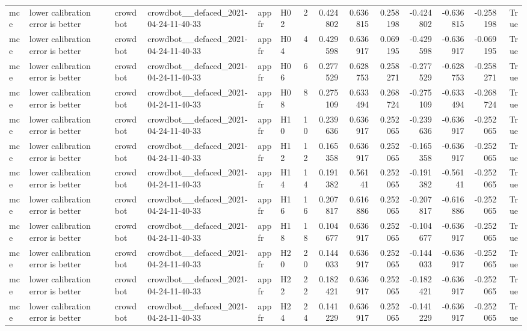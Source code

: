 \begin{longtable}{llllllrrrrrrrr}
mce & lower calibration error is better & crowdbot & crowdbot\_\_defaced\_2021-04-24-11-40-33 & appfr & H02 & 2 & 0.424802 & 0.636815 & 0.258198 & -0.424802 & -0.636815 & -0.258198 & True \\
mce & lower calibration error is better & crowdbot & crowdbot\_\_defaced\_2021-04-24-11-40-33 & appfr & H04 & 4 & 0.429598 & 0.636917 & 0.069195 & -0.429598 & -0.636917 & -0.069195 & True \\
mce & lower calibration error is better & crowdbot & crowdbot\_\_defaced\_2021-04-24-11-40-33 & appfr & H06 & 6 & 0.277529 & 0.628753 & 0.258271 & -0.277529 & -0.628753 & -0.258271 & True \\
mce & lower calibration error is better & crowdbot & crowdbot\_\_defaced\_2021-04-24-11-40-33 & appfr & H08 & 8 & 0.275109 & 0.633494 & 0.268724 & -0.275109 & -0.633494 & -0.268724 & True \\
mce & lower calibration error is better & crowdbot & crowdbot\_\_defaced\_2021-04-24-11-40-33 & appfr & H10 & 10 & 0.239636 & 0.636917 & 0.252065 & -0.239636 & -0.636917 & -0.252065 & True \\
mce & lower calibration error is better & crowdbot & crowdbot\_\_defaced\_2021-04-24-11-40-33 & appfr & H12 & 12 & 0.165358 & 0.636917 & 0.252065 & -0.165358 & -0.636917 & -0.252065 & True \\
mce & lower calibration error is better & crowdbot & crowdbot\_\_defaced\_2021-04-24-11-40-33 & appfr & H14 & 14 & 0.191382 & 0.56141 & 0.252065 & -0.191382 & -0.56141 & -0.252065 & True \\
mce & lower calibration error is better & crowdbot & crowdbot\_\_defaced\_2021-04-24-11-40-33 & appfr & H16 & 16 & 0.207817 & 0.616886 & 0.252065 & -0.207817 & -0.616886 & -0.252065 & True \\
mce & lower calibration error is better & crowdbot & crowdbot\_\_defaced\_2021-04-24-11-40-33 & appfr & H18 & 18 & 0.104677 & 0.636917 & 0.252065 & -0.104677 & -0.636917 & -0.252065 & True \\
mce & lower calibration error is better & crowdbot & crowdbot\_\_defaced\_2021-04-24-11-40-33 & appfr & H20 & 20 & 0.144033 & 0.636917 & 0.252065 & -0.144033 & -0.636917 & -0.252065 & True \\
mce & lower calibration error is better & crowdbot & crowdbot\_\_defaced\_2021-04-24-11-40-33 & appfr & H22 & 22 & 0.182421 & 0.636917 & 0.252065 & -0.182421 & -0.636917 & -0.252065 & True \\
mce & lower calibration error is better & crowdbot & crowdbot\_\_defaced\_2021-04-24-11-40-33 & appfr & H24 & 24 & 0.141229 & 0.636917 & 0.252065 & -0.141229 & -0.636917 & -0.252065 & True \\

\end{longtable}
